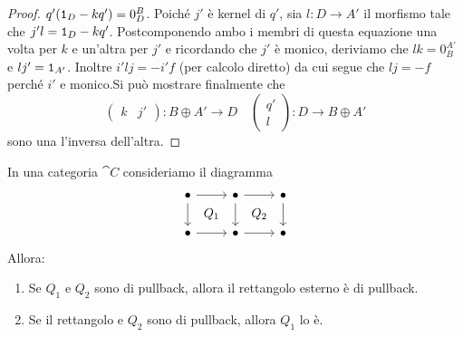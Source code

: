 \begin{proof}
\(q'(\mathtt 1_D-kq') = 0_D^B\). Poiché \(j'\) è kernel di \(q'\), sia
\(l : D \to A'\) il morfismo tale che \(j'l =
\mathtt 1_D-kq'\). Postcomponendo ambo i membri di questa equazione una volta
per \(k\) e un'altra per \(j'\) e ricordando che \(j'\) è monico,
deriviamo che \(lk = 0_B^{A'}\) e \(lj' = \mathtt 1_{A'}\). Inoltre
\(i'lj = -i'f\) (per calcolo diretto) da cui segue che \(lj = -f\)
perché \(i'\) e monico.\newline Si può mostrare finalmente che
\[
  \begin{pmatrix} k & j' \end{pmatrix} : B \oplus A' \to D
  \quad \begin{pmatrix} q' \\ l \end{pmatrix} : D \to B \oplus A'
\]
sono una l'inversa dell'altra.
\end{proof}

\begin{recall}\label{recall:PBLemma}
  In una categoria \(\cat C\) consideriamo il diagramma
  \[
    \begin{tikzcd}
      \bullet \ar["{}", d] \ar["{Q_1}" description, phantom, dr]
      \ar["{}", r] & \bullet \ar["{}", d] \ar["{Q_2}" description,
      phantom, dr] \ar["{}", r] & \bullet
      \ar["{}", d] \\
      \bullet \ar["{}", r] & \bullet \ar["{}", r] & \bullet
    \end{tikzcd}
  \]
  Allora:
  \begin{enumerate}
  \item Se \(Q_1\) e \(Q_2\) sono di pullback, allora il rettangolo
    esterno è di pullback.
  \item Se il rettangolo e \(Q_2\) sono di pullback, allora \(Q_1\) lo
    è.
  \end{enumerate}
\end{recall}

